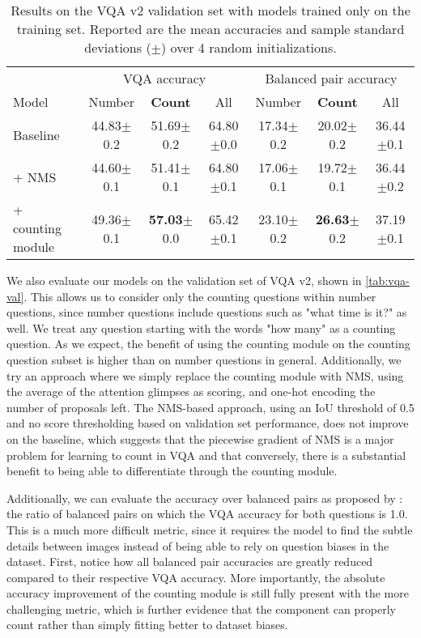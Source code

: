 \documentclass[letterpaper]{article}
\begin{document}
\setlength\tabcolsep{4.2pt}
\begin{table}
    \caption{
        Results on the VQA v2 validation set with models trained only on the training set.
        Reported are the mean accuracies and sample standard deviations ($\pm$) over 4 random initializations.
    }
    \label{tab:vqa-val}
    \centering
    \begin{tabular}{l c c c c c c}
        \\
        \toprule
        & \multicolumn{3}{c}{VQA accuracy} & \multicolumn{3}{c}{Balanced pair accuracy} \\
        \cmidrule(l{4pt}){2-4} \cmidrule(l{4pt}){5-7}
        Model & Number & \textbf{Count} & All & Number & \textbf{Count} & All \\
        \hline
        Baseline & 44.83$\pm$0.2 & 51.69$\pm$0.2 & 64.80$\pm$0.0 & 17.34$\pm$0.2 & 20.02$\pm$0.2 & 36.44$\pm$0.1 \\
        + NMS & 44.60$\pm$0.1 & 51.41$\pm$0.1 & 64.80$\pm$0.1 & 17.06$\pm$0.1 & 19.72$\pm$0.1 & 36.44$\pm$0.2 \\
        + counting module & 49.36$\pm$0.1 & \textbf{57.03}$\pm$0.0 & 65.42$\pm$0.1 & 23.10$\pm$0.2 & \textbf{26.63}$\pm$0.2 & 37.19$\pm$0.1 \\
        \bottomrule
    \end{tabular}
\end{table}


We also evaluate our models on the validation set of VQA v2, shown in \autoref{tab:vqa-val}.
This allows us to consider only the counting questions within number questions, since number questions include questions such as "what time is it?" as well.
We treat any question starting with the words "how many" as a counting question.
As we expect, the benefit of using the counting module on the counting question subset is higher than on number questions in general.
Additionally, we try an approach where we simply replace the counting module with NMS, using the average of the attention glimpses as scoring, and one-hot encoding the number of proposals left.
The NMS-based approach, using an IoU threshold of 0.5 and no score thresholding based on validation set performance, does not improve on the baseline, which suggests that the piecewise gradient of NMS is a major problem for learning to count in VQA and that conversely, there is a substantial benefit to being able to differentiate through the counting module.

Additionally, we can evaluate the accuracy over balanced pairs as proposed by \citet{Teney2017a}: the ratio of balanced pairs on which the VQA accuracy for both questions is 1.0.
This is a much more difficult metric, since it requires the model to find the subtle details between images instead of being able to rely on question biases in the dataset.
First, notice how all balanced pair accuracies are greatly reduced compared to their respective VQA accuracy.
More importantly, the absolute accuracy improvement of the counting module is still fully present with the more challenging metric, which is further evidence that the component can properly count rather than simply fitting better to dataset biases.
\end{document}
